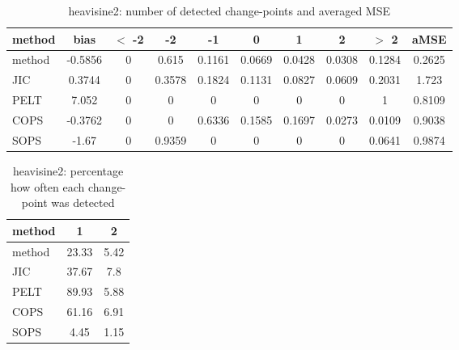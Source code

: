 \begin{table}[ht]
\centering
\begin{tabular}{l|c|ccccccc|c}
  \hline
method & bias & $<$ -2 & -2 & -1 & 0 & 1 & 2 & $>$ 2 & aMSE \\ 
  \hline
method & -0.5856 &     0 & 0.615 & 0.1161 & 0.0669 & 0.0428 & 0.0308 & 0.1284 & 0.2625 \\ 
  JIC & 0.3744 &     0 & 0.3578 & 0.1824 & 0.1131 & 0.0827 & 0.0609 & 0.2031 & 1.723 \\ 
  PELT & 7.052 &     0 &     0 &     0 &     0 &     0 &     0 &     1 & 0.8109 \\ 
  COPS & -0.3762 &     0 &     0 & 0.6336 & 0.1585 & 0.1697 & 0.0273 & 0.0109 & 0.9038 \\ 
  SOPS & -1.67 &     0 & 0.9359 &     0 &     0 &     0 &     0 & 0.0641 & 0.9874 \\ 
   \hline
\end{tabular}
\caption{heavisine2: number of detected change-points and averaged MSE} 
\label{tab:heavisine2Njumps}
\end{table}
\begin{table}[ht]
\centering
\begin{tabular}{l|cc}
  \hline
method & 1 & 2 \\ 
  \hline
method &  23.33 &   5.42 \\ 
  JIC &  37.67 &    7.8 \\ 
  PELT &  89.93 &   5.88 \\ 
  COPS &  61.16 &   6.91 \\ 
  SOPS &   4.45 &   1.15 \\ 
   \hline
\end{tabular}
\caption{heavisine2: percentage how often each change-point was detected} 
\label{tab:heavisine2Detections}
\end{table}

